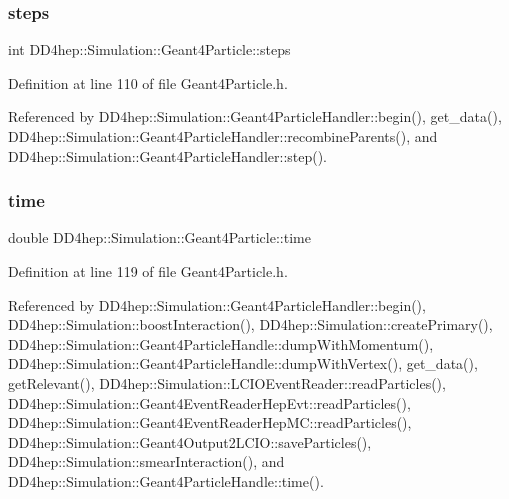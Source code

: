 \hypertarget{class_d_d4hep_1_1_simulation_1_1_geant4_particle_acb743ee2fab907c9734fdb2523132833}{}\label{class_d_d4hep_1_1_simulation_1_1_geant4_particle_acb743ee2fab907c9734fdb2523132833} 
\subsubsection{\texorpdfstring{steps}{steps}}
{\footnotesize\ttfamily int D\+D4hep\+::\+Simulation\+::\+Geant4\+Particle\+::steps}



Definition at line 110 of file Geant4\+Particle.\+h.



Referenced by D\+D4hep\+::\+Simulation\+::\+Geant4\+Particle\+Handler\+::begin(), get\+\_\+data(), D\+D4hep\+::\+Simulation\+::\+Geant4\+Particle\+Handler\+::recombine\+Parents(), and D\+D4hep\+::\+Simulation\+::\+Geant4\+Particle\+Handler\+::step().

\hypertarget{class_d_d4hep_1_1_simulation_1_1_geant4_particle_a01f4419807130fecc3a596659115fd00}{}\label{class_d_d4hep_1_1_simulation_1_1_geant4_particle_a01f4419807130fecc3a596659115fd00} 
\subsubsection{\texorpdfstring{time}{time}}
{\footnotesize\ttfamily double D\+D4hep\+::\+Simulation\+::\+Geant4\+Particle\+::time}



Definition at line 119 of file Geant4\+Particle.\+h.



Referenced by D\+D4hep\+::\+Simulation\+::\+Geant4\+Particle\+Handler\+::begin(), D\+D4hep\+::\+Simulation\+::boost\+Interaction(), D\+D4hep\+::\+Simulation\+::create\+Primary(), D\+D4hep\+::\+Simulation\+::\+Geant4\+Particle\+Handle\+::dump\+With\+Momentum(), D\+D4hep\+::\+Simulation\+::\+Geant4\+Particle\+Handle\+::dump\+With\+Vertex(), get\+\_\+data(), get\+Relevant(), D\+D4hep\+::\+Simulation\+::\+L\+C\+I\+O\+Event\+Reader\+::read\+Particles(), D\+D4hep\+::\+Simulation\+::\+Geant4\+Event\+Reader\+Hep\+Evt\+::read\+Particles(), D\+D4hep\+::\+Simulation\+::\+Geant4\+Event\+Reader\+Hep\+M\+C\+::read\+Particles(), D\+D4hep\+::\+Simulation\+::\+Geant4\+Output2\+L\+C\+I\+O\+::save\+Particles(), D\+D4hep\+::\+Simulation\+::smear\+Interaction(), and D\+D4hep\+::\+Simulation\+::\+Geant4\+Particle\+Handle\+::time().

